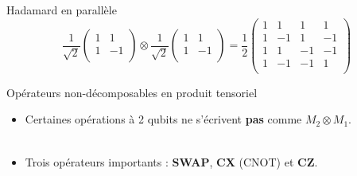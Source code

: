 \documentclass[aspectratio=169,12pt]{beamer}
\begin{document}
\begin{frame}{Hadamard en parallèle}
  \begin{equation*}
    \frac{1}{\sqrt{2}}
    \begin{pmatrix}
      1 &  1 \\
      1 & -1 \\
    \end{pmatrix}
    \otimes
    \frac{1}{\sqrt{2}}
    \begin{pmatrix}
      1 &  1 \\
      1 & -1 \\
    \end{pmatrix}
    = 
    \frac{1}{2}
    \begin{pmatrix}
      1 &  1 &  1 &  1 \\
      1 & -1 &  1 & -1 \\
      1 &  1 & -1 & -1 \\
      1 & -1 & -1 &  1 \\
    \end{pmatrix}
  \end{equation*}
\end{frame}

\begin{frame}{Opérateurs non-décomposables en produit tensoriel}
  \begin{itemize}[<+->]
    \setlength{\itemsep}{0.6em}
    \item Certaines opérations à 2 qubits ne s'écrivent \textbf{pas} comme $M_2 \otimes M_1$.
    \\~\\
    \item Trois opérateurs importants : \textbf{SWAP}, \textbf{CX} (CNOT) et \textbf{CZ}.
  \end{itemize}
\end{frame}
\end{document}
